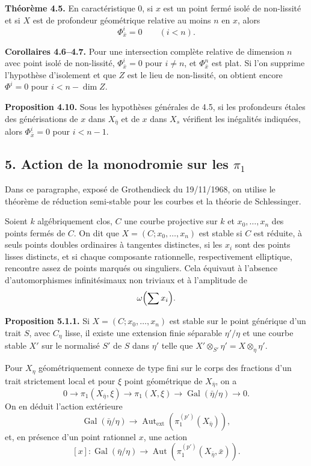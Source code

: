 \documentclass[11pt]{article}
\providecommand{\Gal}{\operatorname{Gal}}
\providecommand{\Aut}{\operatorname{Aut}}
\begin{document}
\textbf{Théorème 4.5.} En caractéristique $0$, si $x$ est un point fermé isolé de non-lissité et si $X$ est de profondeur géométrique relative au moins $n$ en $x$, alors
\[
\Phi^i_{\bar x}=0\qquad (i<n).
\]

\textbf{Corollaires 4.6--4.7.} Pour une intersection complète relative de dimension $n$ avec point isolé de non-lissité, $\Phi^i_{\bar x}=0$ pour $i\ne n$, et $\Phi^n_{\bar x}$ est plat. Si l'on supprime l'hypothèse d'isolement et que $Z$ est le lieu de non-lissité, on obtient encore $\Phi^i=0$ pour $i<n-\dim Z$.

\textbf{Proposition 4.10.} Sous les hypothèses générales de 4.5, si les profondeurs étales des générisations de $x$ dans $X_{\bar\eta}$ et de $x$ dans $X_s$ vérifient les inégalités indiquées, alors $\Phi^i_{\bar x}=0$ pour $i<n-1$.

\subsection*{5. Action de la monodromie sur les $\pi_1$}
Dans ce paragraphe, exposé de Grothendieck du 19/11/1968, on utilise le théorème de réduction semi-stable pour les courbes et la théorie de Schlessinger.

Soient $k$ algébriquement clos, $C$ une courbe projective sur $k$ et $x_0,\ldots,x_n$ des points fermés de $C$. On dit que $X=(C;x_0,\ldots,x_n)$ est stable si $C$ est réduite, à seuls points doubles ordinaires à tangentes distinctes, si les $x_i$ sont des points lisses distincts, et si chaque composante rationnelle, respectivement elliptique, rencontre assez de points marqués ou singuliers. Cela équivaut à l'absence d'automorphismes infinitésimaux non triviaux et à l'amplitude de
\[
\omega\Bigl(\sum x_i\Bigr).
\]

\textbf{Proposition 5.1.1.} Si $X=(C;x_0,\ldots,x_n)$ est stable sur le point générique d'un trait $S$, avec $C_\eta$ lisse, il existe une extension finie séparable $\eta'/\eta$ et une courbe stable $X'$ sur le normalisé $S'$ de $S$ dans $\eta'$ telle que $X'\otimes_{S'}\eta'=X\otimes_\eta\eta'$.

Pour $X_\eta$ géométriquement connexe de type fini sur le corps des fractions d'un trait strictement local et pour $\xi$ point géométrique de $X_{\bar\eta}$, on a
\[
0\to\pi_1(X_{\bar\eta},\xi)\to\pi_1(X,\xi)\to\Gal(\bar\eta/\eta)\to0.
\tag{5.2.1}
\]
On en déduit l'action extérieure
\[
\Gal(\bar\eta/\eta)\to\Aut_{\mathrm{ext}}(\pi_1^{(p')}(X_{\bar\eta})),
\tag{5.2.2}
\]
et, en présence d'un point rationnel $x$, une action
\[
[x]:\Gal(\bar\eta/\eta)\to\Aut(\pi_1^{(p')}(X_{\bar\eta},\bar x)).
\tag{5.2.3}
\]
\end{document}
